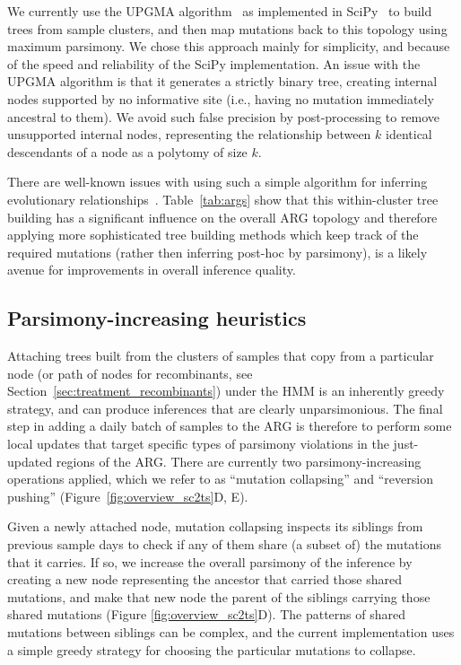 \documentclass{article}
\begin{document}
We currently use the UPGMA algorithm~\citep{Michener1957-tr}
as implemented in SciPy~\citep{Pauli2020-scipy} to build trees from sample
clusters, and then map mutations back to this topology using maximum parsimony.
We chose this approach mainly for simplicity, and because of the
speed and reliability of the SciPy implementation.
An issue with the UPGMA algorithm is that it generates a strictly
binary tree, creating internal nodes
supported by no informative site (i.e., having no mutation immediately
ancestral to them). We avoid such false precision by post-processing
to remove unsupported internal nodes, representing the relationship
between $k$ identical descendants of a node as a polytomy of size $k$.

There are well-known issues with using such a simple algorithm for inferring
evolutionary relationships~\citep{Felsenstein2004-inferring}.
Table~\ref{tab:args} show that
this within-cluster tree building has a significant influence on the
overall ARG topology
and therefore applying more sophisticated
tree building methods which keep track of the required mutations
(rather then inferring post-hoc by parsimony), is a likely avenue
for improvements in overall inference quality.

\subsection{Parsimony-increasing heuristics}
\label{sec:parsimony-heuristics}
Attaching trees built from the clusters of samples that copy from
a particular node (or path of nodes for recombinants,
see Section~\ref{sec:treatment_recombinants}) under the
HMM is an inherently greedy strategy,
and can produce inferences that are clearly unparsimonious.
The final step in adding a daily batch of samples to the ARG
is therefore to perform some local updates that target specific
types of parsimony violations in the just-updated regions of the
ARG. There are currently two parsimony-increasing operations
applied, which we refer to as ``mutation collapsing'' and ``reversion
pushing'' (Figure~\ref{fig:overview_sc2ts}D, E).

Given a newly attached node, mutation collapsing inspects its siblings from
previous sample days to check if any of them share (a subset of) the mutations that
it carries. If so, we increase the overall parsimony of the inference
by creating a new node representing the ancestor that carried
those shared mutations, and make that new node the parent of the
siblings carrying those shared mutations (Figure \ref{fig:overview_sc2ts}D). The patterns of
shared mutations between siblings can be complex, and the current
implementation uses a simple greedy strategy for choosing
the particular mutations to collapse.
\end{document}

